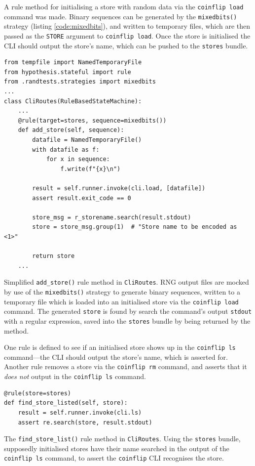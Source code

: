 \documentclass[11pt]{article}
\begin{document}
A rule method for initialising a store with random data via the \texttt{coinflip load} command was made. Binary sequences can be generated by the \texttt{mixedbits()} strategy (listing \ref{code:mixedbits}), and written to temporary files, which are then passed as the \texttt{STORE} argument to \texttt{coinflip load}.  Once the store is initialised the CLI should output the store's name, which can be pushed to the \texttt{stores} bundle.

\begin{listing}[htbp]
\begin{verbatim}
from tempfile import NamedTemporaryFile
from hypothesis.stateful import rule
from .randtests.strategies import mixedbits
...
class CliRoutes(RuleBasedStateMachine):
    ...
    @rule(target=stores, sequence=mixedbits())
    def add_store(self, sequence):
        datafile = NamedTemporaryFile()
        with datafile as f:
            for x in sequence:
                f.write(f"{x}\n")

        result = self.runner.invoke(cli.load, [datafile])
        assert result.exit_code == 0

        store_msg = r_storename.search(result.stdout)
        store = store_msg.group(1)  # "Store name to be encoded as <1>"

        return store
    ...
\end{verbatim}
\caption{Simplified \texttt{add\_store()} rule method in \texttt{CliRoutes}. RNG output files are mocked by use of the \texttt{mixedbits()} strategy to generate binary sequences, written to a temporary file which is loaded into an initialised store via the \texttt{coinflip load} command. The generated \texttt{store} is found by search the command's output \texttt{stdout} with a regular expression, saved into the \texttt{stores} bundle by being returned by the method.}
\end{listing}
\FloatBarrier
One rule is defined to see if an initialised store shows up in the \texttt{coinflip ls} command---the CLI should output the store's name, which is asserted for. Another rule removes a store via the \texttt{coinflip rm} command, and asserts that it \emph{does not} output in the \texttt{coinflip ls} command.

\begin{listing}[htbp]
\begin{verbatim}
@rule(store=stores)
def find_store_listed(self, store):
    result = self.runner.invoke(cli.ls)
    assert re.search(store, result.stdout)
\end{verbatim}
\caption[\texttt{find\_store\_list() definition in \textasciitilde{}CliRoutes}]{The \texttt{find\_store\_list()} rule method in \texttt{CliRoutes}. Using the \texttt{stores} bundle, supposedly initialised stores have their name searched in the output of the \texttt{coinflip ls} command, to assert the \texttt{coinflip} CLI recognises the store.}
\end{listing}
\end{document}
